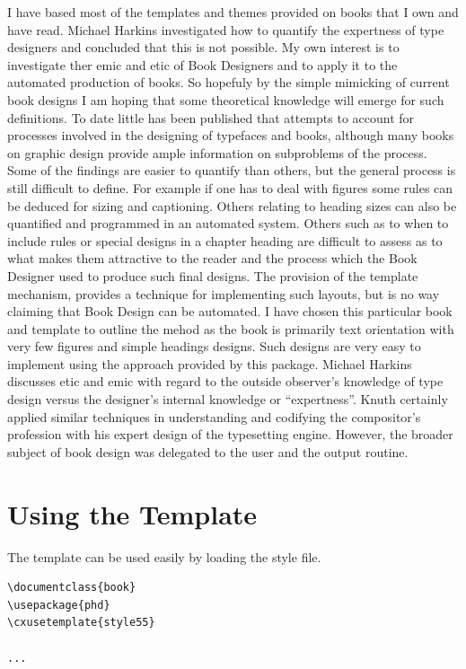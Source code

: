 I have based most of the templates and themes provided on books that I own and have read. Michael Harkins \citep{harkins2013} investigated how to quantify the expertness of type designers and concluded that this is not possible. My own interest is to investigate ther emic and etic of Book Designers and to apply it to the automated production of books. So hopefuly by the simple mimicking of current book designs I am hoping that some theoretical knowledge will emerge for such definitions. To date little has been published that attempts to account for processes involved in the designing of typefaces and books, although many books on graphic design provide ample information on subproblems of the process. Some of the findings are easier to quantify than others, but the
general process is still difficult to define. For example if one has to deal with figures some rules can be deduced for sizing and captioning. Others relating to heading sizes can also be quantified and programmed in an automated system. Others such as to when to include rules or special designs in a chapter heading are difficult to assess as to what makes them attractive to the reader and the process which the Book Designer used to produce such final designs. The provision of the template mechanism, provides a technique for implementing such layouts, but is no way claiming that Book Design can be automated. I have chosen this particular book and template to outline the mehod as the book is primarily text orientation with very few figures and simple headings designs. Such designs are very easy to implement using the approach provided by this package.  Michael Harkins discusses etic and
emic with regard to the outside observer's knowledge of type design versus the designer’s internal knowledge or
“expertness”.  Knuth certainly applied similar techniques in understanding and codifying the compositor’s profession with his expert design of the \tex typesetting engine. However, the broader subject of book design was delegated to the user and the output routine. 

\section{Using the Template}

The template can be used easily by loading the style file.

\begin{verbatim}
\documentclass{book}
\usepackage{phd}
\cxusetemplate{style55}

...

\end{verbatim}

